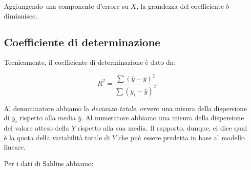 \documentclass[
  11pt,
]{krantz}
\makeatletter
\newenvironment{Shaded}{\begin{snugshade}}{\end{snugshade}}
\newcommand{\AttributeTok}[1]{\textcolor[rgb]{0.61,0.61,0.61}{#1}}
\newcommand{\CommentTok}[1]{\textcolor[rgb]{0.37,0.37,0.37}{\textit{#1}}}
\newcommand{\DecValTok}[1]{\textcolor[rgb]{0.06,0.06,0.06}{#1}}
\newcommand{\FunctionTok}[1]{\textcolor[rgb]{0,0,0}{#1}}
\newcommand{\NormalTok}[1]{#1}
\newcommand{\OtherTok}[1]{\textcolor[rgb]{0.37,0.37,0.37}{#1}}
\newcommand{\SpecialCharTok}[1]{\textcolor[rgb]{0,0,0}{#1}}
\newenvironment{kframe}{%
\medskip{}
\setlength{\fboxsep}{.8em}
 \def\at@end@of@kframe{}%
 \ifinner\ifhmode%
  \def\at@end@of@kframe{\end{minipage}}%
  \begin{minipage}{\columnwidth}%
 \fi\fi%
 \def\FrameCommand##1{\hskip\@totalleftmargin \hskip-\fboxsep
 \colorbox{shadecolor}{##1}\hskip-\fboxsep
     \hskip-\linewidth \hskip-\@totalleftmargin \hskip\columnwidth}%
 \MakeFramed {\advance\hsize-\width
   \@totalleftmargin\z@ \linewidth\hsize
   \@setminipage}}%
 {\par\unskip\endMakeFramed%
 \at@end@of@kframe}
\renewenvironment{Shaded}{\begin{kframe}}{\end{kframe}}
\theoremstyle{definition}
\theoremstyle{definition}
\theoremstyle{definition}
\theoremstyle{definition}
\theoremstyle{remark}
\makeatother
\begin{document}
Aggiungendo una componente d'errore su \(X\), la grandezza del coefficiente \(b\) diminuisce.

\hypertarget{coefficiente-di-determinazione}{%
\subsection{Coefficiente di determinazione}\label{coefficiente-di-determinazione}}

Tecnicamente, il coefficiente di determinazione è dato da:

\[
R^2 = \frac{\sum(\hat{y} - \bar{y})^2}{\sum(y_i - \bar{y})^2}
\]

Al denominatore abbiamo la \emph{devianza totale}, ovvero una misura della dispersione di \(y_i\) rispetto alla media \(\bar{y}\). Al numeratore abbiamo una misura della dispersione del valore atteso della \(Y\) rispetto alla sua media. Il rapporto, dunque, ci dice qual è la quota della variabilità totale di \(Y\) che può essere predetta in base al modello lineare.

Per i dati di Sahlins abbiamo:

\begin{Shaded}
\end{Shaded}
\end{document}
